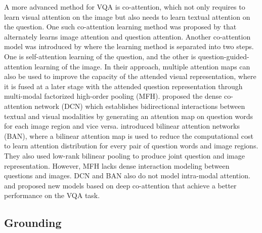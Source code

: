 \documentclass{article}
\begin{document}
A more advanced method for VQA is co-attention, which not only requires to learn visual attention on the image but also needs to learn textual attention on the question. One such co-attention learning method was proposed by \citet{lu2016hierarchical} that alternately learns image attention and question attention. 
Another co-attention model was introduced by \citet{yu2018beyond} where the learning method is separated into two steps. One is self-attention learning of the question, and the other is question-guided-attention learning of the image. In their approach, multiple attention maps can also be used to improve the capacity of the attended visual representation, where it is fused at a later stage with the attended question representation through multi-modal factorized high-order pooling (MFH).
\citet{Nguyen_2018_CVPR} proposed the dense co-attention network (DCN) which establishes bidirectional interactions between textual and visual modalities by generating an attention map on question words for each image region and vice versa. \citet{ban} introduced bilinear attention networks (BAN), where a bilinear attention map is used to reduce the computational cost to learn attention distribution for every pair of question words and image regions. They also used low-rank bilinear pooling to produce joint question and image representation. However, MFH lacks dense interaction modeling between questions and images. DCN and BAN also do not model intra-modal attention. \citet{gao2019dynamic} and \citet{yu2019mcan} proposed new models based on deep co-attention that achieve a better performance on the VQA task. %


\subsection{Grounding}
\end{document}
